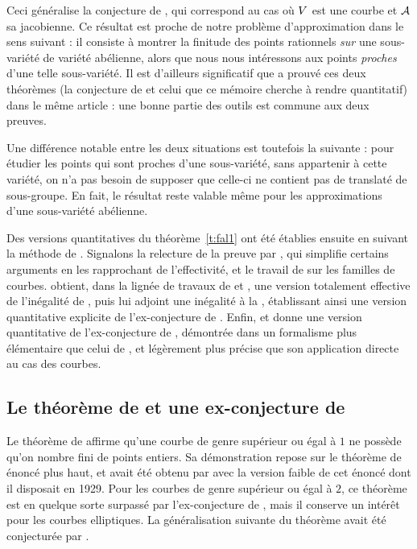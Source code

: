 Ceci généralise la conjecture de , qui correspond au cas où \(
  V \) est une courbe et \( \mathcal A \) sa jacobienne. Ce résultat est proche
de notre problème d'approximation dans le sens suivant : il consiste à montrer
la finitude des points rationnels \emph{sur} une sous-variété de variété
abélienne, alors que nous nous intéressons aux points \emph{proches} d'une
telle sous-variété. Il est d'ailleurs significatif que  a prouvé
ces deux théorèmes (la conjecture de  et celui que ce
mémoire cherche à rendre quantitatif) dans le même article : une bonne partie
des outils est commune aux deux preuves.

Une différence notable entre les deux situations est toutefois la suivante :
pour étudier les points qui sont proches d'une sous-variété, sans appartenir
à cette variété, on n'a pas besoin de supposer que celle-ci ne contient pas de
translaté de sous-groupe. En fait, le résultat reste valable même pour les
approximations d'une sous-variété abélienne.

Des versions quantitatives du théorème~\vref{t:fal1} ont été établies ensuite
en suivant la méthode de .  Signalons la relecture de la preuve par
 \cite{bommcr}, qui simplifie certains arguments en les
rapprochant de l'effectivité, et le travail de  \cite{ddprf} sur
les familles de courbes.  obtient, dans la lignée de travaux de
 et , une version totalement effective de
l'inégalité de  \cite{remivds}, puis lui adjoint une inégalité à la
, établissant ainsi une version quantitative explicite
\cite{remdcl} de l'ex-conjecture de . Enfin, 
\cite[chap.~3]{farhith} et \cite{faraptf} donne une version quantitative de
l'ex-conjecture de , démontrée dans un formalisme plus élémentaire
que celui de , et légèrement plus précise que son application
directe au cas des courbes.


\subsection{Le théorème de  et une ex-conjecture de }
\label{s:siegel}

Le théorème de  \cite{siegel} affirme qu'une courbe de genre
supérieur ou égal à \( 1 \) ne possède qu'on nombre fini de points entiers. Sa
démonstration repose sur le théorème de  énoncé plus haut, et avait
été obtenu par  avec la version faible de cet énoncé dont il
disposait en 1929. Pour les courbes de genre supérieur ou égal à \( 2 \), ce
théorème est en quelque sorte surpassé par l'ex-conjecture de ,
mais il conserve un intérêt pour les courbes elliptiques. La généralisation
suivante du théorème avait été conjecturée par  \cite{laipc}.

